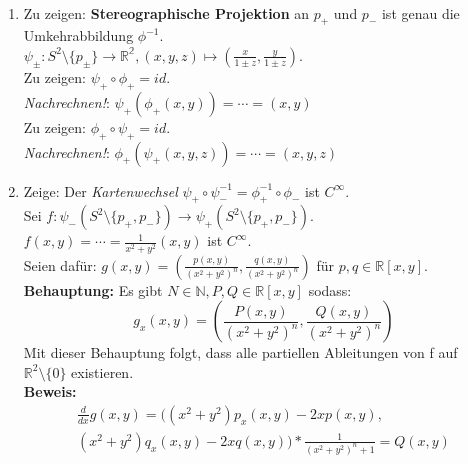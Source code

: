 \begin{solution}
  \
  \begin{enumerate}[label= (\alph*)]
    \item Zu zeigen: \textbf{Stereographische Projektion} an \( p_+ \) und \( p_- \) ist genau die Umkehrabbildung \( \phi^{-1} \). \\
    \( \psi_\pm : S^2 \setminus \{ p_\pm \} \to \mathbb{R^2}, (x,y,z) \mapsto (\frac{x}{1\pm z},\frac{y}{1\pm z}) \). \\
    Zu zeigen: \( \psi_+ \circ \phi_+ = id \). \\ \emph{Nachrechnen!}: \( \psi_+ (\phi_+ (x,y)) = \cdots = (x,y) \) \\
    Zu zeigen: \( \phi_+ \circ \psi_+ = id \). \\ \emph{Nachrechnen!}: \( \phi_+ (\psi_+ (x,y,z)) = \cdots = (x,y,z) \) 
    
    \item Zeige: Der \emph{Kartenwechsel} \( \psi_+ \circ \psi_-^{-1} = \phi_+^{-1} \circ \phi_- \) ist \( C^{\infty} \). \\
    Sei \( f: \psi_- (S^{2} \setminus \{ p_+, p_- \}) \to \psi_+(S^{2} \setminus \{ p_+, p_- \}) \). \\
    \( f(x,y) = \cdots = \frac{1}{x^2 + y^2}(x,y) \) ist \( C^{\infty} \). \\
    Seien dafür: \( g(x,y) = (\frac{p(x,y)}{{(x^2 + y^2)}^n}, \frac{q(x,y)}{{(x^2 + y^2)}^n}) \) für \( p,q \in \mathbb{R}[x,y] \). \\
    \textbf{Behauptung:} Es gibt \( N \in \mathbb{N}, P, Q \in \mathbb{R}[x,y] \) sodass:
    \begin{equation*}
      g_x(x,y) = \left(\frac{P(x,y)}{{(x^2 + y^2)}^n}, \frac{Q(x,y)}{{(x^2 + y^2)}^n} \right)
    \end{equation*}
    Mit dieser Behauptung folgt, dass alle partiellen Ableitungen von f auf \( \mathbb{R}^2 \setminus \{ 0 \} \) existieren. \\
    \textbf{Beweis:}
    \begin{align*}
      \frac{d}{dx} g(x,y) = ((x^2 + y^2) p_x(x,y) - 2x p(x,y), \\
      (x^2 + y^2) q_x(x,y) - 2x q(x,y))
      * \frac{1}{{(x^2 + y^2)}^n+1} = Q(x,y)
    \end{align*}
  \end{enumerate}
\end{solution}

